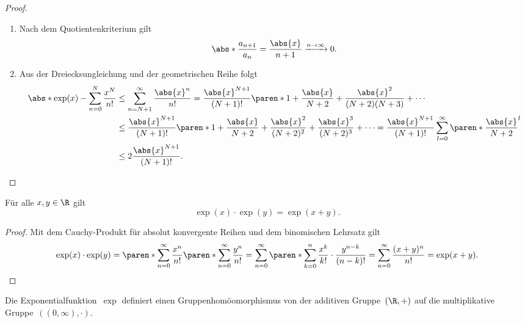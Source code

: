 \documentclass[a4paper]{article}
\begin{document}
\begin{proof}\leavevmode
    \begin{enumerate}
        \item Nach dem Quotientenkriterium gilt
        \begin{equation*}
            \abs*{\frac{a_{n+1}}{a_n}} = \frac{\abs{x}}{n+1} \xrightarrow{n\to\infty} 0.
        \end{equation*}
        \item Aus der Dreiecksungleichung und der geometrischen Reihe folgt
        \begin{align*}
            \abs*{\exp(x) - \sum_{n=0}^N \frac{x^N}{n!}} &\leq \sum_{n=N+1}^\infty \frac{\abs{x}^n}{n!} = \frac{\abs{x}^{N+1}}{(N+1)!} \paren*{1 + \frac{\abs{x}}{N+2} + \frac{\abs{x}^2}{(N+2)(N+3)} + \cdots} \\
            &\leq \frac{\abs{x}^{N+1}}{(N+1)!} \paren*{1 + \frac{\abs{x}}{N+2} + \frac{\abs{x}^2}{(N+2)^2} + \frac{\abs{x}^3}{(N+2)^3} + \cdots} = \frac{\abs{x}^{N+1}}{(N+1)!} \sum_{l=0}^\infty \paren*{\frac{\abs{x}}{N+2}}^l \\
            &\leq 2\frac{\abs{x}^{N+1}}{(N+1)!}. \qedhere
        \end{align*}
    \end{enumerate}
\end{proof}

\begin{theorem}[Funktionalgleichung]
    Für alle $x,y \in \R$ gilt
    \begin{equation*}
        \exp(x) \cdot \exp(y) = \exp(x+y).
    \end{equation*}
\end{theorem}

\begin{proof}
    Mit dem Cauchy-Produkt für absolut konvergente Reihen und dem binomischen Lehrsatz gilt
    \begin{equation*}
        \exp(x) \cdot \exp(y) = \paren*{\sum_{n=0}^\infty \frac{x^n}{n!}} \paren*{\sum_{n=0}^\infty \frac{y^n}{n!}} = \sum_{n=0}^\infty \paren*{\sum_{k=0}^n \frac{x^k}{k!} \cdot \frac{y^{n-k}}{(n-k)!}} = \sum_{n=0}^\infty \frac{(x+y)^n}{n!} = \exp(x+y). \qedhere
    \end{equation*}
\end{proof}

\begin{remark}
    Die Exponentialfunktion~$\exp$ definiert einen Gruppenhomöomorphismus von der additiven Gruppe~$(\R,+)$ auf die multiplikative Gruppe~$((0,\infty),\cdot)$.
\end{remark}
\end{document}
